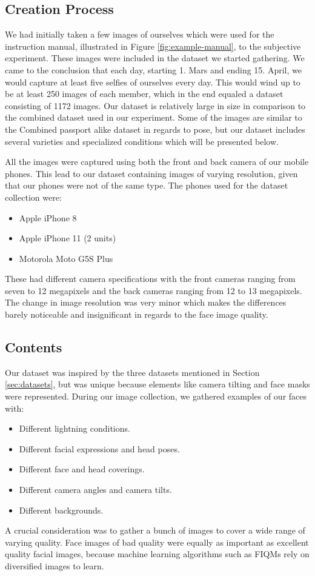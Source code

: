 \subsection*{Creation Process}
We had initially taken a few images of ourselves which were used for the instruction manual, illustrated in Figure \ref{fig:example-manual}, to the subjective experiment. These images were included in the dataset we started gathering. We came to the conclusion that each day, starting 1. Mars and ending 15. April, we would capture at least five selfies of ourselves every day. This would wind up to be at least 250 images of each member, which in the end equaled a dataset consisting of 1172 images. Our dataset is relatively large in size in comparison to the combined dataset used in our experiment. Some of the images are similar to the Combined passport alike dataset in regards to pose, but our dataset includes several varieties and specialized conditions which will be presented below. 

All the images were captured using both the front and back camera of our mobile phones. This lead to our dataset containing images of varying resolution, given that our phones were not of the same type. The phones used for the dataset collection were:
\begin{itemize}
    \item Apple iPhone 8 
    \item Apple iPhone 11 (2 units)
    \item Motorola Moto G5S Plus 
\end{itemize}
These had different camera specifications with the front cameras ranging from seven to 12 megapixels and the back cameras ranging from 12 to 13 megapixels. The change in image resolution was very minor which makes the differences barely noticeable and insignificant in regards to the face image quality.

\subsection*{Contents}
Our dataset was inspired by the three datasets mentioned in Section \ref{sec:datasets}, but was unique because elements like camera tilting and face masks were represented. During our image collection, we gathered examples of our faces with: 
%
\begin{itemize}
    \item Different lightning conditions.
    \item Different facial expressions and head poses.
    \item Different face and head coverings. 
    \item Different camera angles and camera tilts.
    \item Different backgrounds.
\end{itemize}
%
A crucial consideration was to gather a bunch of images to cover a wide range of varying quality. Face images of bad quality were equally as important as excellent quality facial images, because machine learning algorithms such as FIQMs rely on diversified images to learn.  

